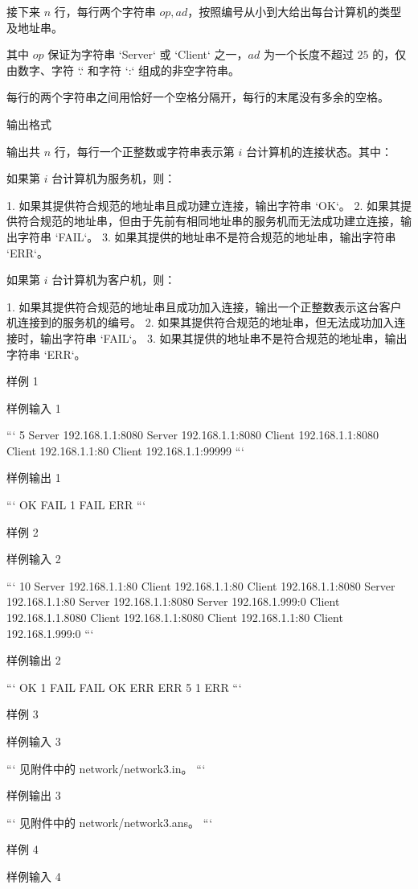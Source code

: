 \documentclass[12pt,twiside,a4paper]{ctexbook}
\numberwithin{chapter}{part}
\begin{document}
接下来 $n$ 行，每行两个字符串 $\mathit{op}, \mathit{ad}$，按照编号从小到大给出每台计算机的类型及地址串。

其中 $\mathit{op}$ 保证为字符串 `Server` 或 `Client` 之一，$\mathit{ad}$ 为一个长度不超过 $25$ 的，仅由数字、字符 `.` 和字符 `:` 组成的非空字符串。

每行的两个字符串之间用恰好一个空格分隔开，每行的末尾没有多余的空格。

 输出格式

输出共 $n$ 行，每行一个正整数或字符串表示第 $i$ 台计算机的连接状态。其中：

如果第 $i$ 台计算机为服务机，则：

1. 如果其提供符合规范的地址串且成功建立连接，输出字符串 `OK`。
2. 如果其提供符合规范的地址串，但由于先前有相同地址串的服务机而无法成功建立连接，输出字符串 `FAIL`。
3. 如果其提供的地址串不是符合规范的地址串，输出字符串 `ERR`。

如果第 $i$ 台计算机为客户机，则：

1. 如果其提供符合规范的地址串且成功加入连接，输出一个正整数表示这台客户机连接到的服务机的编号。
2. 如果其提供符合规范的地址串，但无法成功加入连接时，输出字符串 `FAIL`。
3. 如果其提供的地址串不是符合规范的地址串，输出字符串 `ERR`。

 样例 1

 样例输入 1

```
5
Server 192.168.1.1:8080
Server 192.168.1.1:8080
Client 192.168.1.1:8080
Client 192.168.1.1:80
Client 192.168.1.1:99999
```

 样例输出 1

```
OK
FAIL
1
FAIL
ERR
```

 样例 2

 样例输入 2

```
10
Server 192.168.1.1:80
Client 192.168.1.1:80
Client 192.168.1.1:8080
Server 192.168.1.1:80
Server 192.168.1.1:8080
Server 192.168.1.999:0
Client 192.168.1.1.8080
Client 192.168.1.1:8080
Client 192.168.1.1:80
Client 192.168.1.999:0
```

 样例输出 2

```
OK
1
FAIL
FAIL
OK
ERR
ERR
5
1
ERR
```

 样例 3

 样例输入 3

```
见附件中的 network/network3.in。
```

 样例输出 3

```
见附件中的 network/network3.ans。
```

 样例 4

 样例输入 4
\end{document}
